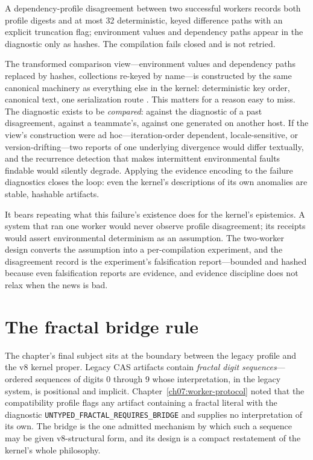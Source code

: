 \begin{ruleenv}\label{ch08:rule:disagreement}
A dependency-profile disagreement between two successful workers records both profile digests and at most 32 deterministic, keyed difference paths with an explicit truncation flag; environment values and dependency paths appear in the diagnostic only as hashes. The compilation fails closed and is not retried.
\end{ruleenv}

\begin{remark}\label{ch08:rem:diag-canonical}
The transformed comparison view---environment values and dependency paths replaced by hashes, collections re-keyed by name---is constructed by the same canonical machinery as everything else in the kernel: deterministic key order, canonical text, one serialization route \cite{jcs}. This matters for a reason easy to miss. The diagnostic exists to be \emph{compared}: against the diagnostic of a past disagreement, against a teammate's, against one generated on another host. If the view's construction were ad hoc---iteration-order dependent, locale-sensitive, or version-drifting---two reports of one underlying divergence would differ textually, and the recurrence detection that makes intermittent environmental faults findable would silently degrade. Applying the evidence encoding to the failure diagnostics closes the loop: even the kernel's descriptions of its own anomalies are stable, hashable artifacts.
\end{remark}

It bears repeating what this failure's existence does for the kernel's epistemics. A system that ran one worker would never observe profile disagreement; its receipts would assert environmental determinism as an assumption. The two-worker design converts the assumption into a per-compilation experiment, and the disagreement record is the experiment's falsification report---bounded and hashed because even falsification reports are evidence, and evidence discipline does not relax when the news is bad.

\section{The fractal bridge rule}\label{ch08:fractal}

The chapter's final subject sits at the boundary between the legacy profile and the v8 kernel proper. Legacy CAS artifacts contain \emph{fractal digit sequences}---ordered sequences of digits 0 through 9 whose interpretation, in the legacy system, is positional and implicit. Chapter~\ref{ch07:worker-protocol} noted that the compatibility profile flags any artifact containing a fractal literal with the diagnostic \texttt{UNTYPED\_FRACTAL\_REQUIRES\_BRIDGE} and supplies no interpretation of its own. The bridge is the one admitted mechanism by which such a sequence may be given v8-structural form, and its design is a compact restatement of the kernel's whole philosophy.

